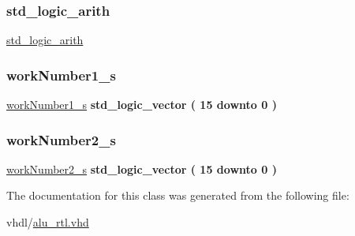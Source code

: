 \subsubsection{\texorpdfstring{std\+\_\+logic\+\_\+arith}{std\_logic\_arith}}
{\footnotesize\ttfamily \hyperlink{classalu_1_1rtl_a0f5ecc6613f63d07f7963a97b1b26095}{std\+\_\+logic\+\_\+arith}\hspace{0.3cm}{\ttfamily [Package]}}

\mbox{\label{classalu_1_1rtl_a5a831871c33fc7a57d57212ac50a2087}} 
\subsubsection{\texorpdfstring{work\+Number1\+\_\+s}{workNumber1\_s}}
{\footnotesize\ttfamily \hyperlink{classalu_1_1rtl_a5a831871c33fc7a57d57212ac50a2087}{work\+Number1\+\_\+s} {\bfseries \textcolor{comment}{std\+\_\+logic\+\_\+vector}\textcolor{vhdlchar}{ }\textcolor{vhdlchar}{(}\textcolor{vhdlchar}{ }\textcolor{vhdlchar}{ } \textcolor{vhdldigit}{15} \textcolor{vhdlchar}{ }\textcolor{keywordflow}{downto}\textcolor{vhdlchar}{ }\textcolor{vhdlchar}{ } \textcolor{vhdldigit}{0} \textcolor{vhdlchar}{ }\textcolor{vhdlchar}{)}\textcolor{vhdlchar}{ }} \hspace{0.3cm}{\ttfamily [Signal]}}

\mbox{\label{classalu_1_1rtl_afabe271df421708b7490fb85875a5d89}} 
\subsubsection{\texorpdfstring{work\+Number2\+\_\+s}{workNumber2\_s}}
{\footnotesize\ttfamily \hyperlink{classalu_1_1rtl_afabe271df421708b7490fb85875a5d89}{work\+Number2\+\_\+s} {\bfseries \textcolor{comment}{std\+\_\+logic\+\_\+vector}\textcolor{vhdlchar}{ }\textcolor{vhdlchar}{(}\textcolor{vhdlchar}{ }\textcolor{vhdlchar}{ } \textcolor{vhdldigit}{15} \textcolor{vhdlchar}{ }\textcolor{keywordflow}{downto}\textcolor{vhdlchar}{ }\textcolor{vhdlchar}{ } \textcolor{vhdldigit}{0} \textcolor{vhdlchar}{ }\textcolor{vhdlchar}{)}\textcolor{vhdlchar}{ }} \hspace{0.3cm}{\ttfamily [Signal]}}



The documentation for this class was generated from the following file\+:\begin{DoxyCompactItemize}
\item 
vhdl/\hyperlink{alu__rtl_8vhd}{alu\+\_\+rtl.\+vhd}\end{DoxyCompactItemize}
